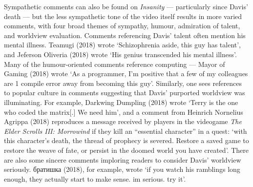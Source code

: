 \documentclass[Draft.tex]{subfiles}
\begin{document}

Sympathetic comments can also be found on \textit{Insanity} --- particularly
since Davis' death --- but the less sympathetic tone of the video itself
results in more varied comments, with four broad themes of sympathy, humour,
admiration of talent, and worldview evaluation.
Comments referencing Davis' talent often mention his mental illness.
Teamugi (2018) wrote `Schizophrenia aside, this guy has talent', and
Jeferson Oliveria (2018) wrote `His genius transcended his mental illness'.
Many of the humour-oriented comments reference computing ---
Mayor of Gaming (2018) wrote `As a programmer, I'm positive that
a few of my colleagues are 1 compile error away from becoming this guy'.
Similarly, one sees references to popular culture in comments suggesting
that Davis' purported worldview was illuminating.
For example, Darkwing Dumpling (2018) wrote
`Terry is the one who coded the matrix[.] We need him',
and a comment from Heinrich Nornelius Agrippa (2018)
reproduces a message received by players in the videogame
\textit{The Elder Scrolls III: Morrowind} if they kill an
``essential character'' in a quest:
`with this character's death,
the thread of prophecy is severed.
Restore a saved game to restore the weave of fate,
or persist in the doomed world you have created'.
There are also some sincere comments imploring readers to
consider Davis' worldview seriously.
\foreignlanguage{russian}{братишка} (2018), for example, wrote
`if you watch his ramblings long enough,
they actually start to make sense. im serious. try it'.
\end{document}
